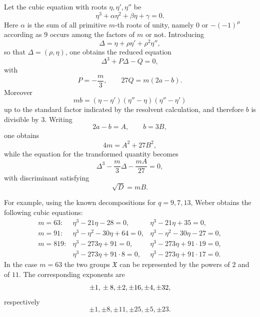 \documentclass[11pt]{article}
\providecommand{\grpX}{\mathfrak X}
\begin{document}
Let the cubic equation with roots $\eta,\eta',\eta''$ be
\begin{equation}
   \eta^3+\alpha\eta^2+\beta\eta+\gamma=0.
   \tag{9}
\end{equation}
Here $\alpha$ is the sum of all primitive $m$-th roots of unity, namely $0$ or $-(-1)^\mu$ according as $9$ occurs among the factors of $m$ or not.  Introducing
\[
   \Delta=\eta+\rho\eta'+\rho^2\eta'',
\]
so that $\Delta=(\rho,\eta)$, one obtains the reduced equation
\begin{equation}
   \Delta^3+P\Delta-Q=0,
   \tag{10}
\end{equation}
with
\begin{equation}
   P=-\frac{m}{3},
   \qquad
   27Q=m(2a-b).
   \tag{11}
\end{equation}
Moreover
\begin{equation}
   m b=(\eta-\eta')(
\eta''-\eta)(\eta''-\eta')
   \tag{12}
\end{equation}
up to the standard factor indicated by the resolvent calculation, and therefore $b$ is divisible by $3$.  Writing
\begin{equation}
   2a-b=A,
   \qquad b=3B,
\end{equation}
one obtains
\begin{equation}
   4m=A^2+27B^2,
   \tag{13}
\end{equation}
while the equation for the transformed quantity becomes
\begin{equation}
   \Delta^3-\frac{m}{3}\Delta-\frac{mA}{27}=0,
   \tag{14}
\end{equation}
with discriminant satisfying
\begin{equation}
   \sqrt D=mB.
   \tag{15}
\end{equation}

For example, using the known decompositions for $q=9,7,13$, Weber obtains the following cubic equations:
\[
\begin{array}{rcl}
 m=63:& \eta^3-21\eta-28=0,&
        \eta^3-21\eta+35=0,\\[2mm]
 m=91:& \eta^3-\eta^2-30\eta+64=0,&
        \eta^3-\eta^2-30\eta-27=0,\\[2mm]
 m=819:& \eta^3-273\eta+91=0,&
        \eta^3-273\eta+91\cdot19=0,\\
       & \eta^3-273\eta+91\cdot8=0,&
        \eta^3-273\eta+91\cdot17=0.
\end{array}
\]
In the case $m=63$ the two groups $\grpX$ can be represented by the powers of $2$ and of $11$.  The corresponding exponents are
\[
 \pm1,\\ \pm8,
\pm2,
\pm16,
\pm4,
\pm32,
\]
respectively
\[
 \pm1,
\pm8,
\pm11,
\pm25,
\pm5,
\pm23 .
\]
\end{document}
